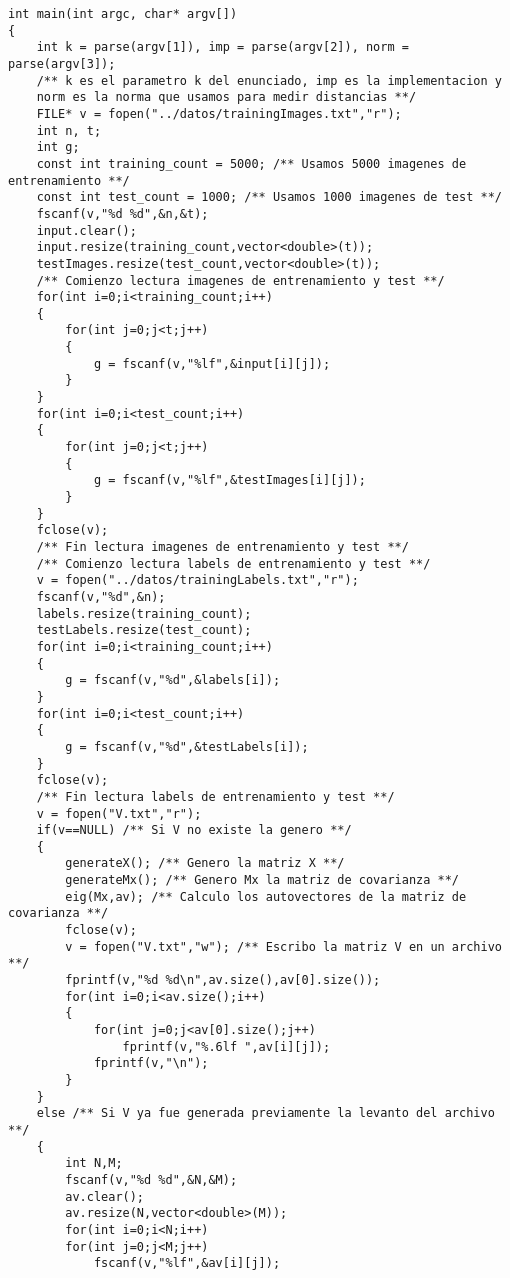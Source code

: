 \begin{lstlisting}
int main(int argc, char* argv[])
{
    int k = parse(argv[1]), imp = parse(argv[2]), norm = parse(argv[3]);
    /** k es el parametro k del enunciado, imp es la implementacion y 
    norm es la norma que usamos para medir distancias **/
	FILE* v = fopen("../datos/trainingImages.txt","r");
	int n, t;
    int g;
    const int training_count = 5000; /** Usamos 5000 imagenes de entrenamiento **/
    const int test_count = 1000; /** Usamos 1000 imagenes de test **/
	fscanf(v,"%d %d",&n,&t);
	input.clear();
	input.resize(training_count,vector<double>(t));
	testImages.resize(test_count,vector<double>(t));
	/** Comienzo lectura imagenes de entrenamiento y test **/
	for(int i=0;i<training_count;i++)
    {
        for(int j=0;j<t;j++)
        {
            g = fscanf(v,"%lf",&input[i][j]);
        }
    }
    for(int i=0;i<test_count;i++)
    {
		for(int j=0;j<t;j++)
		{
			g = fscanf(v,"%lf",&testImages[i][j]);
		}
	}
	fclose(v);
	/** Fin lectura imagenes de entrenamiento y test **/
	/** Comienzo lectura labels de entrenamiento y test **/
    v = fopen("../datos/trainingLabels.txt","r");
    fscanf(v,"%d",&n);
    labels.resize(training_count);
    testLabels.resize(test_count);
    for(int i=0;i<training_count;i++)
    {
        g = fscanf(v,"%d",&labels[i]);
    }
    for(int i=0;i<test_count;i++)
    {
		g = fscanf(v,"%d",&testLabels[i]);
	}
	fclose(v);
	/** Fin lectura labels de entrenamiento y test **/
	v = fopen("V.txt","r");
	if(v==NULL) /** Si V no existe la genero **/
	{
        generateX(); /** Genero la matriz X **/
        generateMx(); /** Genero Mx la matriz de covarianza **/
        eig(Mx,av); /** Calculo los autovectores de la matriz de covarianza **/
        fclose(v);
        v = fopen("V.txt","w"); /** Escribo la matriz V en un archivo **/
        fprintf(v,"%d %d\n",av.size(),av[0].size());
        for(int i=0;i<av.size();i++)
        {
            for(int j=0;j<av[0].size();j++)
                fprintf(v,"%.6lf ",av[i][j]);
            fprintf(v,"\n");
        }
	}
	else /** Si V ya fue generada previamente la levanto del archivo **/
	{
	    int N,M;
	    fscanf(v,"%d %d",&N,&M);
	    av.clear();
	    av.resize(N,vector<double>(M));
	    for(int i=0;i<N;i++)
	    for(int j=0;j<M;j++)
            fscanf(v,"%lf",&av[i][j]);


\end{lstlisting}
